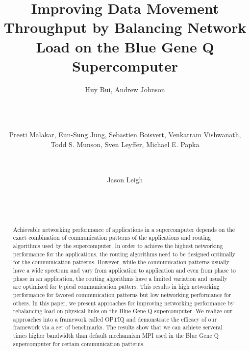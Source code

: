 \documentclass{acm_proc_article-sp}
\begin{document}
\title{Improving Data Movement Throughput by Balancing Network Load on the Blue Gene Q Supercomputer}

\author{
\alignauthor Huy Bui, Andrew Johnson\\
       \\
       \\
       \\
\and  %
\alignauthor Preeti Malakar, Eun-Sung Jung, Sebastien Boisvert, Venkatram Vishwanath, Todd S. Munson, Sven Leyffer, Michael E. Papka\\
       \\
       \\
\and
\alignauthor Jason Leigh\\
       \\
       \\
       \\
}

\maketitle
\begin{abstract}
Achievable networking performance of applications in a supercomputer depends on the exact combination of communication patterns of the applications and routing algorithms used by the supercomputer. In order to achieve the highest networking performance for the applications, the routing algorithms need to be designed optimally for the communication patterns. However, while the communication patterns usually have a wide spectrum and vary from application to application and even from phase to phase in an application, the routing algorithms have a limited variation and usually are optimized for typical communication patters. This results in high networking performance for favored communication patterns but low networking performance for others. In this paper, we present approaches for improving networking performance by rebalancing load on physical links on the Blue Gene Q supercomputer. We realize our approaches into a framework called OPTIQ and demonstrate the efficacy of our framework via a set of benchmarks. The results show that we can achieve serveral times higher bandwidth than default mechannism MPI used in the Blue Gene Q supercomputer for certain communication patterns.
\end{abstract}
\end{document}
